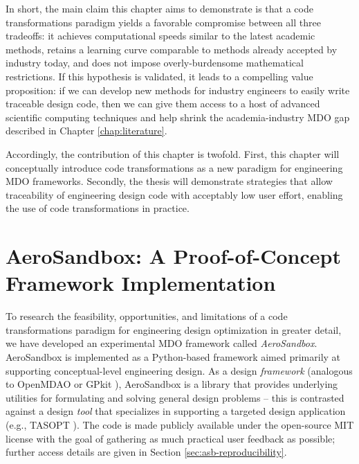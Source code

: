 In short, the main claim this chapter aims to demonstrate is that a code transformations paradigm yields a favorable compromise between all three tradeoffs: it achieves computational speeds similar to the latest academic methods, retains a learning curve comparable to methods already accepted by industry today, and does not impose overly-burdensome mathematical restrictions. If this hypothesis is validated, it leads to a compelling value proposition: if we can develop new methods for industry engineers to easily write traceable design code, then we can give them access to a host of advanced scientific computing techniques and help shrink the academia-industry MDO gap described in Chapter \ref{chap:literature}.

Accordingly, the contribution of this chapter is twofold. First, this chapter will conceptually introduce code transformations as a new paradigm for engineering MDO frameworks. Secondly, the thesis will demonstrate strategies that allow traceability of engineering design code with acceptably low user effort, enabling the use of code transformations in practice.








\section{AeroSandbox: A Proof-of-Concept Framework Implementation}

To research the feasibility, opportunities, and limitations of a code transformations paradigm for engineering design optimization in greater detail, we have developed an experimental MDO framework called \emph{AeroSandbox}. AeroSandbox is implemented as a Python-based framework aimed primarily at supporting conceptual-level engineering design. As a design \emph{framework} (analogous to OpenMDAO \cite{gray_openmdao_2019} or GPkit \cite{gpkit}), AeroSandbox is a library that provides underlying utilities for formulating and solving general design problems -- this is contrasted against a design \emph{tool} that specializes in supporting a targeted design application (e.g., TASOPT \cite{drela_tasopt_2010}). The code is made publicly available under the open-source MIT license with the goal of gathering as much practical user feedback as possible; further access details are given in Section \ref{sec:asb-reproducibility}.

